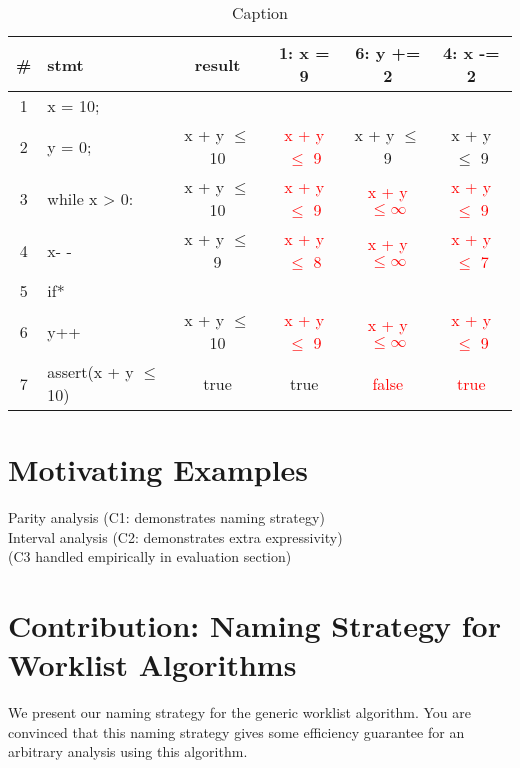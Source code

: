 \documentclass[acmlarge,anonymous]{acmart}\settopmatter{printfolios=true}
\begin{document}
\begin{table}[]
    \centering
    \begin{tabular}{|c|l|c|c|c|c|}
        \hline
        \# & stmt & result & 1: x = 9 & 6: y += 2 & 4: x -= 2 \\
        \hline
        1 & x = 10; & & & &\\
        \hline
        2 & y = 0; & x + y $\le$ 10 & \textcolor{red}{x + y $\le$ 9} & x + y $\le$ 9 & x + y $\le$ 9\\
        \hline
        3 & while x > 0: & x + y $\le$ 10 & \textcolor{red}{x + y $\le$ 9} & \textcolor{red}{x + y $\le \infty$} & \textcolor{red}{x + y $\le$ 9}\\
        \hline
        4 & \hspace*{0.3cm} x- - & x + y $\le$ 9 & \textcolor{red}{x + y $\le$ 8} & \textcolor{red}{x + y $\le \infty$} & \textcolor{red}{x + y $\le$ 7}\\
        \hline
        5 & \hspace*{0.3cm} if* & & & &\\
        \hline
        6 & \hspace*{0.6cm} y++ & x + y $\le$ 10 & \textcolor{red}{x + y $\le$ 9} & \textcolor{red}{x + y $\le \infty$} & \textcolor{red}{x + y $\le$ 9}\\
        \hline
        7 & assert(x + y $\le$ 10) & true & true & \textcolor{red}{false} & \textcolor{red}{true}\\
        \hline
    \end{tabular}
    \caption{Caption}
    \label{tab:my_label}
\end{table}

\section{Motivating Examples}

Parity analysis (C1: demonstrates naming strategy)\\
Interval analysis (C2: demonstrates extra expressivity)\\
(C3 handled empirically in evaluation section)

\section{Contribution: Naming Strategy for Worklist Algorithms}

We present our naming strategy for the generic worklist algorithm. You are convinced that this naming strategy gives some efficiency guarantee for an arbitrary analysis using this algorithm.\\
\end{document}

